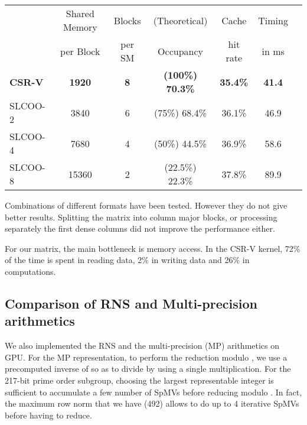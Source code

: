 \documentclass[runningheads,orivec]{llncs}
\begin{document}
  \begin{center}
    \begin{tabular}{|l||c|c|c|c|c|c|}
      \hline
       & \footnotesize Shared Memory & \footnotesize Blocks & \footnotesize (Theoretical) & \footnotesize Cache & \footnotesize Timing \\
       & \footnotesize per Block & \footnotesize per SM & \footnotesize Occupancy  & \footnotesize hit rate & \footnotesize in ms \\  
      \hline
	  \hline
      \bf \footnotesize CSR-V & \bf \footnotesize 1920 & \bf \footnotesize 8 & \bf \footnotesize (100\%) 70.3\% & \bf \footnotesize 35.4\% & \bf \footnotesize 41.4 \\
      \hline
      \footnotesize SLCOO-2 & \footnotesize 3840 & \footnotesize 6 & \footnotesize (75\%) 68.4\% & \footnotesize 36.1\% & \footnotesize 46.9 \\
      \hline 	
      \footnotesize SLCOO-4 & \footnotesize 7680 & \footnotesize 4 & \footnotesize (50\%) 44.5\% & \footnotesize 36.9\% & \footnotesize 58.6 \\
      \hline
      \footnotesize SLCOO-8 & \footnotesize 15360 & \footnotesize 2 & \footnotesize (22.5\%) 22.3\% & \footnotesize 37.8\% & \footnotesize 89.9 \\
      \hline
    \end{tabular}
  \end{center}

\vspace*{-0.25cm}

Combinations of different formats have been tested. However they do not give better results. Splitting the matrix into column major blocks, or processing separately the first dense columns did not improve the performance either.    

For our matrix, the main bottleneck is memory access. In the CSR-V kernel, 72\% of the time is spent in reading data, 2\% in writing data and 26\% in computations. 


\vspace*{-0.25cm}
\subsection{Comparison of RNS and Multi-precision arithmetics}
\vspace*{-0.25cm}

\label{RNS vs MP}
We also implemented the RNS and the multi-precision (MP) arithmetics on GPU. For the MP representation, to perform the reduction modulo , we use a precomputed inverse of  so as to divide by  using a single multiplication. For the 217-bit prime order subgroup, choosing the largest representable integer  is sufficient to accumulate a few number of SpMVs before reducing modulo . In fact, the maximum row norm that we have (492) allows to do up to 4 iterative SpMVs before having to reduce.
\end{document}

